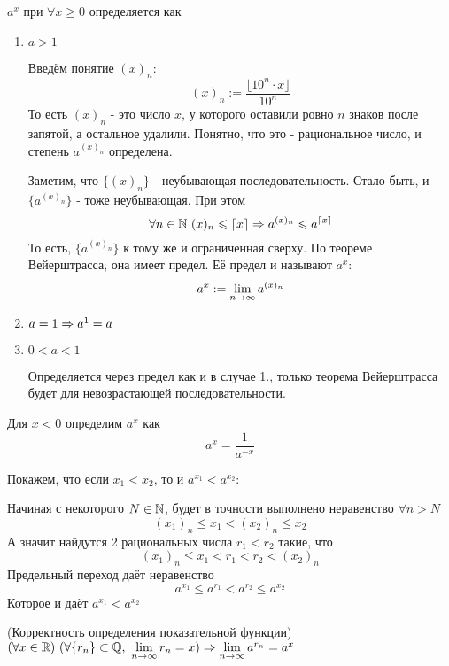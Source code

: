 \begin{definition}
	$a^x$ при $\forall x \ge 0$ определяется как
	\begin{enumerate}
		\item $a > 1$
		
		Введём понятие $(x)_n$:
		\[
			(x)_n := \frac{\lfloor10^n \cdot x\rfloor}{10^n}
		\]
		То есть $(x)_n$ - это число $x$, у которого оставили ровно $n$ знаков после запятой, а остальное удалили. Понятно, что это - рациональное число, и степень $a^{(x)_n}$ определена.
		
		Заметим, что $\{(x)_n\}$ - неубывающая последовательность. Стало быть, и $\{a^{(x)_n}\}$ - тоже неубывающая. При этом
		\[
			\forall n \in \mathbb{N}\ (x)_n \leqslant \lceil x \rceil \Rightarrow a^{(x)_n} \leqslant a^{\lceil x \rceil}
		\]
		То есть, $\{a^{(x)_n}\}$ к тому же и ограниченная сверху. По теореме Вейерштрасса, она имеет предел. Её предел и называют $a^x$:
		\[
			a^x := \lim\limits_{n \to \infty} a^{(x)_n}
		\]
		
		\item $a = 1 \Rightarrow a^1 = a$
		
		\item $0 < a < 1$
		
		Определяется через предел как и в случае 1., только теорема Вейерштрасса будет для невозрастающей последовательности.
	\end{enumerate}
    Для $x < 0$ определим $a^x$ как
	\[
		a^x = \frac{1}{a^{-x}}
	\]
	
	Покажем, что если $x_1 < x_2$, то и $a^{x_1} < a^{x_2}$:
	
	Начиная с некоторого $N \in \mathbb{N}$, будет в точности выполнено неравенство $\forall n > N$
	\[
		(x_1)_n \le x_1 < (x_2)_n \le x_2 
	\]
	А значит найдутся 2 рациональных числа $r_1 < r_2$ такие, что
	\[
		(x_1)_n \le x_1 < r_1 < r_2 < (x_2)_n
	\]
	Предельный переход даёт неравенство
	\[
		a^{x_1} \le a^{r_1} < a^{r_2} \le a^{x_2}
	\]
	Которое и даёт $a^{x_1} < a^{x_2}$
\end{definition}


    \begin{lemma} (Корректность определения показательной функции)
        $(\forall x \in \R)\ (\forall \{r_n\} \subset \Q,\ \liml_{n \to \infty} r_n = x) \Ra \liml_{n \to \infty} a^{r_n} = a^x$
    \end{lemma}
    
